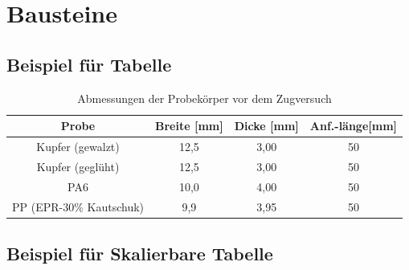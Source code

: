 \chapter{Bausteine}

\section{Beispiel für Tabelle}

\vspace*{-2.5mm}
\renewcommand{\arraystretch}{1.2}
\begin{table}[h!]
	\centering
	\caption{Abmessungen der Probekörper vor dem Zugversuch}
	\label{tab:tabelle1}
	\begin{tabulary}{\textwidth}{C|CCC}
		\hline
		\textbf{Probe}  &\textbf{Breite [mm]}&\textbf{Dicke [mm]}&\textbf{Anf.-länge[mm]} \\ 
		\hline
		Kupfer (gewalzt) & 12,5 &3,00&50\\
		Kupfer (geglüht) & 12,5&3,00&50\\
		PA6 & 10,0&4,00&50\\
		PP (EPR-30\% Kautschuk) & 9,9 &3,95&50\\
		\hline
	\end{tabulary}
\end{table}
\FloatBarrier
\vspace*{-2.5mm}

\section{Beispiel für Skalierbare Tabelle}
\begin{table}[h!]
	\centering
\end{table}
\FloatBarrier

